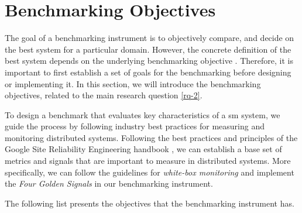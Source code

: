 \section{Benchmarking Objectives}
\label{sec:system:objectives}


The goal of a benchmarking instrument is to objectively compare, and decide on the best system for a particular domain. However, the concrete definition of the best system depends on the underlying benchmarking objective \cite{folkerts2012benchmarking}. Therefore, it is important to first establish a set of goals for the benchmarking before designing or implementing it. In this section, we will introduce the benchmarking objectives, related to the main research question \ref{rq-2}.

To design a benchmark that evaluates key characteristics of a \gls{sm} system, we guide the process by following industry best practices for measuring and monitoring distributed systems. Following the best practices and principles of the Google Site Reliability Engineering handbook \cite{beyer2016}, we can establish a base set of metrics and signals that are important to measure in distributed systems. More specifically, we can follow the guidelines for \textit{white-box monitoring} and implement the  \textit{Four Golden Signals} in our benchmarking instrument.

The following list presents the objectives that the benchmarking instrument has.


